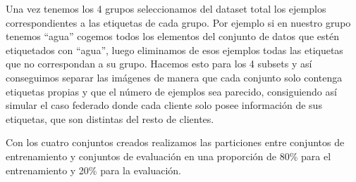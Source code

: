 \begin{table}[!ht]
	\centering
	\caption{Distribución de etiquetas}
	\label{table:label_distribution}
\end{table}

Una vez tenemos los 4 grupos seleccionamos del dataset total los ejemplos correspondientes a las etiquetas de cada grupo. Por ejemplo si en nuestro grupo tenemos ``agua'' cogemos todos los elementos del conjunto de datos que estén etiquetados con ``agua'', luego eliminamos de esos ejemplos todas las etiquetas que no correspondan a su grupo. Hacemos esto para los 4 subsets y así conseguimos separar las imágenes de manera que cada conjunto solo contenga etiquetas propias y que el número de ejemplos sea parecido, consiguiendo así simular el caso federado donde cada cliente solo posee información de sus etiquetas, que son distintas del resto de clientes.

Con los cuatro conjuntos creados realizamos las particiones entre conjuntos de entrenamiento y conjuntos de evaluación en una proporción de 80\% para el entrenamiento y 20\% para la evaluación.

